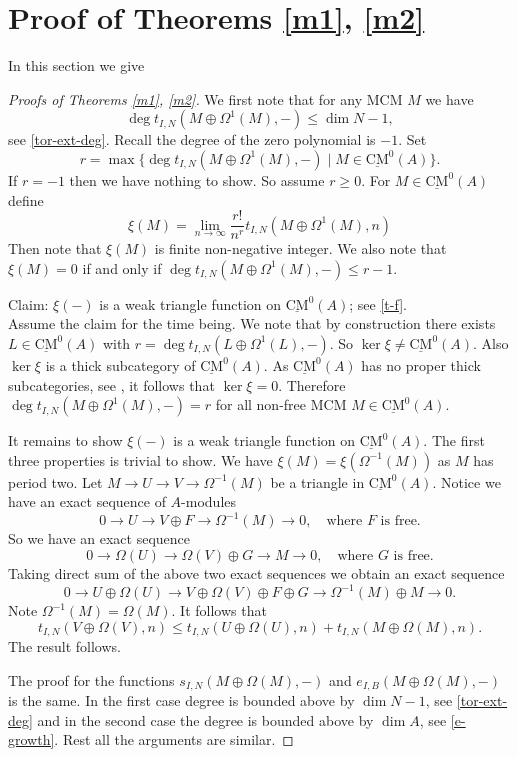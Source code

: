 \documentclass{amsart}
\newcommand{\rt}{\rightarrow}
\newcommand{\CMS}{\operatorname{\underline{CM}}}
\theoremstyle{plain}
\theoremstyle{definition}
\theoremstyle{remark}
\begin{document}
\section{Proof of Theorems \ref{m1}, \ref{m2}}
In this section we give
\begin{proof}[Proofs of Theorems \ref{m1}, \ref{m2}]
We first note that for any MCM $M$ we have
$$\deg t_{ I, N}(M \oplus \Omega^1(M), -) \leq \dim N - 1, $$ see
\ref{tor-ext-deg}.
 Recall the degree of the zero polynomial is $-1$. Set
 $$ r = \max \{\deg  t_{I, N}(M\oplus \Omega^1(M), -) \mid M \in  \CMS^0(A) \}. $$
If $r = -1$ then we have nothing to show. So assume $r \geq 0$.  For $M \in \CMS^0(A)$ define
\[
\xi(M) = \lim_{n \rt \infty} \frac{r!}{n^r} t_{ I, N}(M \oplus \Omega^1(M), n)
\]
Then note that $\xi(M)$ is finite non-negative integer. We also note that $\xi(M) = 0$ if and only if $\deg  t_{I, N}(M\oplus \Omega^1(M), -) \leq r -1$.

Claim: $\xi(-)$ is a weak triangle function on $\CMS^0(A)$; see \ref{t-f}.\\
Assume the claim for the time being. We note that by construction there exists $L \in \CMS^0(A)$ with $r = \deg  t_{I, N}(L\oplus \Omega^1(L), -)$.
So $\ker \xi \neq \CMS^0(A)$. Also $\ker \xi$ is a thick subcategory of $\CMS^0(A)$.  As $\CMS^0(A)$ has no proper thick subcategories, see \cite[6.6]{T}, it follows that $\ker \xi = 0$.
Therefore
$\deg t_{ I, N}(M \oplus \Omega^1(M), -) = r$ for all non-free MCM $M \in \CMS^0(A)$.

It remains to show $\xi(-)$ is a weak triangle function on $\CMS^0(A)$. The first three properties is trivial to show.
We have $\xi(M) = \xi(\Omega^{-1}(M))$ as $M$ has period two.
Let $M \rt U \rt V \rt \Omega^{-1}(M)$ be a triangle in $\CMS^0(A)$. Notice we have an exact sequence of $A$-modules
$$0 \rt U \rt V\oplus F \rt \Omega^{-1}(M) \rt 0, \quad \text{where $F$ is free}.$$
So we have an exact sequence
 $$0 \rt \Omega(U) \rt \Omega(V)\oplus G\rt M \rt 0, \quad \text{where $G$ is free}.$$
 Taking direct sum of the above two exact sequences we obtain an exact sequence
 $$ 0 \rt U \oplus\Omega(U) \rt V \oplus\Omega(V)\oplus F \oplus G \rt \Omega^{-1}(M)\oplus M \rt 0.$$
 Note $\Omega^{-1}(M) = \Omega(M)$. It follows that
 $$t_{I, N}(V \oplus \Omega(V), n) \leq t_{I, N}(U \oplus \Omega(U), n)  + t_{I, N}(M \oplus \Omega(M), n).$$
 The result follows.

 The proof for the functions $s_{I, N}(M \oplus \Omega(M), -)$ and $e_{I, B}(M \oplus \Omega(M), -)$ is the same. In the first case degree is bounded above by $\dim N - 1$, see \ref{tor-ext-deg}
 and in the second case the degree is bounded above by $\dim A$, see \ref{e-growth}. Rest all the arguments are similar.
\end{proof}
\end{document}
